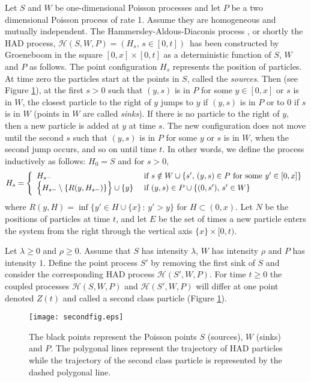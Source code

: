 \documentclass[reqno, 12pt]{amsart}
\begin{document}
Let $S$ and $W$ be one-dimensional Poisson processes and let $P$ be a two
dimensional Poisson process of rate 1. Assume they are homogeneous and mutually
independent.  The Hammersley-Aldous-Diaconis process \cite{h, ad}, or shortly
the HAD process, ${{\mathcal H}}(S,W,P)=(H_s, \,s\in[0,t])$\ has been constructed by
Groeneboom \cite{g} in the square $[0,x]\times[0,t]$ as a deterministic function
of $S$, $W$ and $P$ as follows. The point configuration $H_s$ represents the
position of particles. At time zero the particles start at the points in $S$,
called the \emph{sources}. Then (see Figure \ref{HAD}), at the first $s>0$ such
that $(y,s)$ is in $P$ for some $y\in[0,x]$ or $s$ is in $W$, the closest
particle to the right of $y$ jumps to $y$ if $(y,s)$ is in $P$ or to $0$ if $s$
is in $W$ (points in $W$ are called \emph{sinks}). If there is no particle to
the right of $y$, then a new particle is added at $y$ at time $s$. The new
configuration does not move until the second $s$ such that $(y,s)$ is in $P$ for
some $y$ or $s$ is in $W$, when the second jump occurs, and so on until time
$t$. In other words, we define the process inductively as follows: $H_0=S$ and
for $s>0$,
\[
H_s =\left\{
\begin{array}{ll}
  H_{s-} &\hbox { if } s\notin W \cup \{s',\, (y,s)\in P \hbox{ for some }
  y'\in[0,x]\}\\
\Big\{ H_{s-} \setminus \{R(y,H_{s-})\}\Big\} \cup \{y\}&\hbox { if } (y,s)\in P \cup
\{(0,s'),\,s'\in W\}
\end{array}
\right.
\]
where $R(y,H) = \inf\{y'\in H\cup\{x\}\,:\, y'>y\}$ for $H\subset (0,x)$. Let
$N$ be the positions of particles at time $t$, and let $E$ be the set of times a
new particle enters the system from the right through the vertical axis
$\{x\}\times [0,t)$.

Let $\lambda\geq 0$ and $\rho\geq 0$. Assume that $S$ has intensity $\lambda$,
$W$ has intensity $\rho$ and $P$ has intensity $1$. Define the point process
$S'$ by removing the first sink of $S$ and consider the corresponding HAD
process ${{\mathcal H}}(S',W,P)$. For time $t\geq 0$ the coupled processes ${{\mathcal H}}(S,W,P)$ and
${{\mathcal H}}(S',W,P)$ will differ at one point denoted $Z(t)$ and called a second class
particle (Figure \ref{HAD}).

\begin{figure}[h]
\begin{center}
\texttt{[image: secondfig.eps]}
\end{center}
\caption{The black points represent the Poisson points $S$ (sources), $W$
  (sinks) and $P$. The polygonal lines represent the trajectory of HAD particles
  while the trajectory of the second class particle is represented by the dashed
  polygonal line.}\label{HAD}
\end{figure}
\end{document}
